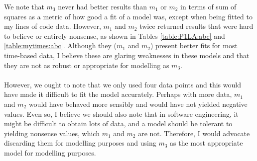 We note that $m_3$ never had better results than $m_1$ or $m_2$ in terms of sum
of squares as a metric of how good a fit of a model was, except when being
fitted to my lines of code data.
However, $m_1$ and $m_2$ twice returned results that were hard to believe or
entirely nonsense, as shown in Tables \ref{table:P1LA:abc} and
\ref{table:mytimes:abc}.
Although they ($m_1$ and $m_2$) present better fits for most time-based data, I believe these are
glaring weaknesses in these models and that they are not as robust or
appropriate for modelling as $m_3$.\\
\\
However, we ought to note that we only used four data points and this would have
made it difficult to fit the model accurately.
Perhaps with more data, $m_1$ and $m_2$ would have behaved more sensibly and
would have not yielded negative values.
Even so, I believe we should also note that in software engineering, it might be
difficult to obtain lots of data, and a model should be tolerant to yielding
nonsense values, which $m_1$ and $m_2$ are not.
Therefore, I would advocate discarding them for modelling purposes and using
$m_3$ as the most appropriate model for modelling purposes.
